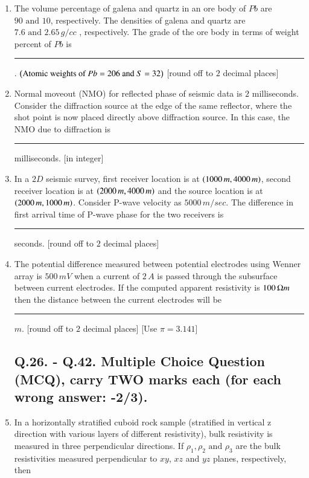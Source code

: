 \documentclass[journal,12pt,onecolumn]{IEEEtran}
\theoremstyle{remark}
\begin{document}
\begin{enumerate}
    \item The volume percentage of galena and quartz in an ore body of $Pb$ are $90\text{ and }10$, respectively. The densities of galena and quartz are $7.6\text{ and }2.65\,g/cc$ , respectively. The grade of the ore body in terms of weight percent of $Pb$ is \rule{3cm}{0.15mm}. $\left(\text{Atomic weights of } Pb = 206 \text{ and } S=32\right)$ [round off to $2$ decimal places] \hfill{}
    
    \item Normal moveout (NMO) for reflected phase of seismic data is $2$ milliseconds. Consider the diffraction source at the edge of the same reflector, where the shot point is now placed directly above diffraction source. In this case, the NMO due to diffraction is \rule{3cm}{0.15mm} milliseconds. [in integer] \hfill{}
    
    \item In a $2D$ seismic survey, first receiver location is at $\left(1000\, m , 4000\, m\right)$, second receiver location is at $\left(2000\, m , 4000\, m\right)$ and the source location is at $\left(2000\, m , 1000\, m\right)$. Consider P-wave velocity as $5000\, m/sec$. The difference in first arrival time of P-wave phase for the two receivers is \rule{3cm}{0.15mm} seconds. [round off to $2$ decimal places] \hfill{}
    
    \item The potential difference measured between potential electrodes using Wenner array is $500\,mV$ when a current of $2\,A$ is passed through the subsurface between current electrodes. If the computed apparent resistivity is $100\,\ohm m$ then the distance between the current electrodes will be \rule{3cm}{0.15mm} $m$. [round off to $2$ decimal places] [Use $\pi=3.141$] \hfill{}
    
    \subsection*{Q.26. - Q.42. Multiple Choice Question (MCQ), carry TWO marks each (for each wrong answer: -2/3).}
    
    \item In a horizontally stratified cuboid rock sample (stratified in vertical z direction with various layers of different resistivity), bulk resistivity is measured in three perpendicular directions. If $\rho_1, \rho_2\text{ and }\rho_3$ are the bulk resistivities measured perpendicular to $xy$, $xz$ and $yz$ planes, respectively, then
    

\end{enumerate}
\end{document}
